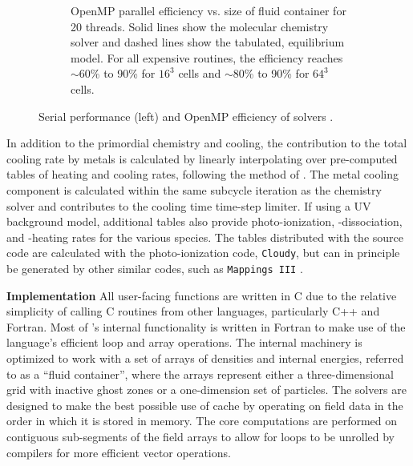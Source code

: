 \begin{figure}[h]
\begin{subfigure}{.42\textwidth}
  \caption{OpenMP parallel efficiency vs. size of fluid container for
    20 threads.  Solid lines show the molecular
    chemistry solver and dashed lines show the tabulated, equilibrium
    model.  For all expensive routines, the efficiency reaches
    $\sim$60\% to 90\% for $16^3$ cells and $\sim$80\% to 90\% for
    $64^3$ cells.}
  \label{fig:openmp}
\end{subfigure}%
\vspace*{-0.5\baselineskip}
\caption{Serial performance (left) and OpenMP efficiency of
   solvers \citep[from][]{2017MNRAS.466.2217S}.}
\label{fig:performance}
\vspace*{-0.5\baselineskip}
\end{figure}

In addition to the primordial chemistry and cooling, the contribution
to the total cooling rate by metals is calculated by linearly
interpolating over pre-computed tables of heating and cooling rates,
following the method of \citet{2008MNRAS.385.1443S}.
The metal cooling component is calculated within the same subcycle
iteration as the chemistry solver and contributes to the cooling time
time-step limiter.
If using a UV background model,
additional tables also provide photo-ionization, -dissociation, and
-heating rates for the various species.
The tables distributed with the source code are calculated with the
photo-ionization code, \texttt{Cloudy}, but can in principle be
generated by other similar codes, such as \texttt{Mappings III}
\citep{1993ApJS...88..253S}.

\noindent
{\bf Implementation}
All user-facing \grackle{} functions are written in C due
to the relative simplicity of calling C routines from other
languages, particularly C++ and Fortran.  Most of \grackle{}'s
internal functionality is written in Fortran to make use of the
language's efficient loop and array operations.
The internal machinery is optimized to work with a set of arrays of
densities and internal energies, referred to as a ``fluid
container'', where the arrays represent either a three-dimensional
grid with inactive ghost zones or a one-dimension set of particles.
The solvers are designed to make the best possible use of cache by
operating on field data in the order in which it is stored in memory.
The core computations are performed on
contiguous sub-segments of the field arrays to allow for loops to be
unrolled by compilers for more efficient vector operations.

